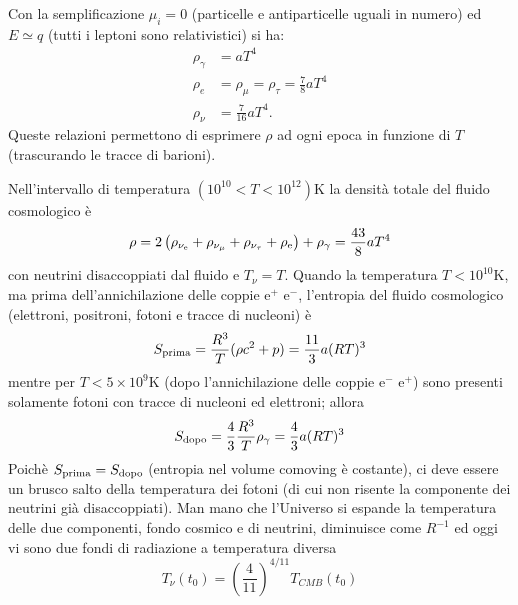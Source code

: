 Con la semplificazione $\mu_i=0$ (particelle e antiparticelle uguali in numero)
ed $E \simeq q$ (tutti i leptoni sono relativistici) si ha:
\begin{subequations}
  \begin{align}
    \rho_{\gamma} & = a T^4 \\
    \rho_e &=\rho_{\mu}=\rho_{\tau} = \frac{7}{8} a T^4 \\
    \rho_{\nu}    & = \frac{7}{16} a T^4.
  \end{align}
\end{subequations}
Queste relazioni permettono di esprimere $\rho$ ad ogni epoca in funzione di $T$
(trascurando le tracce di barioni).

Nell'intervallo di temperatura $(10^{10} < T < 10^{12})$K la densità totale del
fluido cosmologico è
\begin{equation}
  \rho = 2 \left(\rho_{\nu_\textup{e}} + \rho_{\nu_{\mu}} + \rho_{\nu_{\tau}} +
    \rho_{\textup{e}} \right)+\rho_{\gamma}=\frac{43}{8}a T^4
\end{equation}
con neutrini disaccoppiati dal fluido e $T_{\nu}=T$.  Quando la temperatura
$T<10^{10}$K, ma prima dell'annichilazione delle coppie e$^+$ e$^-$, l'entropia
del fluido cosmologico (elettroni, positroni, fotoni e tracce di nucleoni) è
\begin{equation}
  S_{\textup{prima}}= \frac{R^3}{T} (\rho c^2 +p) = \frac{11}{3} a (RT)^3
\end{equation}
mentre per $T<5 \times 10^9$K (dopo l'annichilazione delle coppie e$^{-}$ e$^+$)
sono presenti solamente fotoni con tracce di nucleoni ed elettroni; allora
\begin{equation}
  S_{\textup{dopo}}= \frac{4}{3}\frac{R^3}{T} \rho_{\gamma} = \frac{4}{3} a (RT)^3
\end{equation}
Poichè $S_{\textup{prima}} = S_{\textup{dopo}}$ (entropia nel volume comoving è
costante), ci deve essere un brusco salto della temperatura dei fotoni (di cui
non risente la componente dei neutrini già disaccoppiati).  Man mano che
l'Universo si espande la temperatura delle due componenti, fondo cosmico e di
neutrini, diminuisce come $R^{-1}$ ed oggi vi sono due fondi di radiazione a
temperatura diversa
\begin{equation}
  T_{\nu}(t_0) = \left(\frac{4}{11}\right)^{4/11} T_{CMB}(t_0)
\end{equation}

